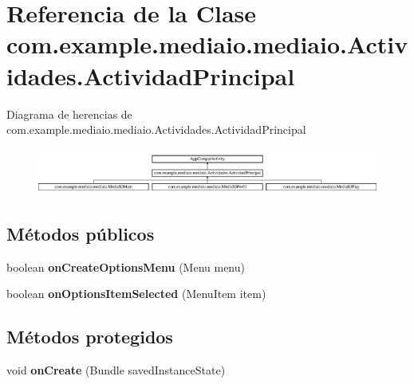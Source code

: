 \hypertarget{classcom_1_1example_1_1mediaio_1_1mediaio_1_1_actividades_1_1_actividad_principal}{}\section{Referencia de la Clase com.\+example.\+mediaio.\+mediaio.\+Actividades.\+Actividad\+Principal}
\label{classcom_1_1example_1_1mediaio_1_1mediaio_1_1_actividades_1_1_actividad_principal}
Diagrama de herencias de com.\+example.\+mediaio.\+mediaio.\+Actividades.\+Actividad\+Principal\begin{figure}[H]
\begin{center}
\leavevmode
\includegraphics[height=1.538462cm]{classcom_1_1example_1_1mediaio_1_1mediaio_1_1_actividades_1_1_actividad_principal}
\end{center}
\end{figure}
\subsection*{Métodos públicos}
\begin{DoxyCompactItemize}
\item 
\mbox{\label{classcom_1_1example_1_1mediaio_1_1mediaio_1_1_actividades_1_1_actividad_principal_a37f2b352b90ed62b99883932170b4d07}} 
boolean {\bfseries on\+Create\+Options\+Menu} (Menu menu)
\item 
\mbox{\label{classcom_1_1example_1_1mediaio_1_1mediaio_1_1_actividades_1_1_actividad_principal_af757e79380d7a7caccf267274e1d6c9c}} 
boolean {\bfseries on\+Options\+Item\+Selected} (Menu\+Item item)
\end{DoxyCompactItemize}
\subsection*{Métodos protegidos}
\begin{DoxyCompactItemize}
\item 
\mbox{\label{classcom_1_1example_1_1mediaio_1_1mediaio_1_1_actividades_1_1_actividad_principal_ab7d3f06e9ac1e4eb36d33de3b6e0ec8c}} 
void {\bfseries on\+Create} (Bundle saved\+Instance\+State)
\end{DoxyCompactItemize}


